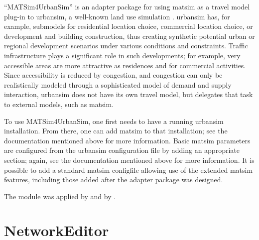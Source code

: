 ``MATSim4UrbanSim'' is an adapter package for using \gls{matsim} as a travel model plug-in to \gls{urbansim}, a well-known land use simulation \citep[e.g.][see \url{http://www.urbansim.org}]{WaddellEtc2003UrbanSim}.
\gls{urbansim} has, for example, submodels for residential location choice, commercial location choice, or development and building construction, thus creating synthetic  potential urban or regional development scenarios under various conditions and constraints. 
Traffic infrastructure plays a significant role in such developments; for example, very accessible areas are more attractive as residences and for commercial activities. 
Since accessibility is reduced by congestion, and congestion can only be realistically modeled through a sophisticated model of demand and supply interaction, \gls{urbansim} does not have its own travel model, but delegates that task to external models, such as \gls{matsim}.

To use MATSim4UrbanSim, one first needs to have a running \gls{urbansim} installation. 
From there, one can add \gls{matsim} to that installation; see %
the documentation mentioned above for more information. 
Basic \gls{matsim} parameters are configured from the \gls{urbansim} configuration file by adding an appropriate section; again, see 
the documentation mentioned above for more information. 
It is possible to add a standard \gls{matsim} \gls{configfile} allowing use of the extended \gls{matsim} features, including those added after the adapter package was designed.

The module was applied by \citet{CabritaEtcSustaincityHandbookBrusselsChapter} and by \citet[][]{ZoelligRenner_PhDThesis_2014}.

\section{NetworkEditor}
\label{sec:contrib-networkEditor}

